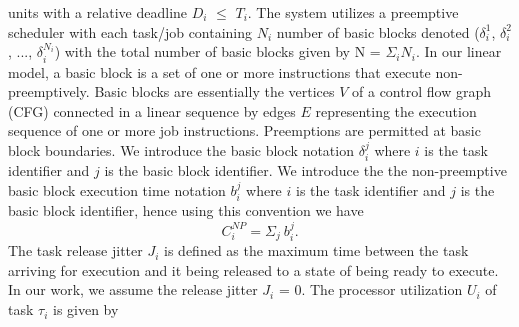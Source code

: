 units with a relative deadline \begin{math}D_{i}\end{math} \begin{math}\leq\end{math} \begin{math}T_{i}\end{math}.  The system utilizes a preemptive scheduler with each task/job containing \begin{math}N_{i}\end{math} number of basic blocks denoted (\begin{math}\delta_{i}^{1}\end{math}, \begin{math}\delta_{i}^{2}\end{math}, ..., \begin{math}\delta_{i}^{N_{i}}\end{math}) with the total number of basic blocks given by N = \begin{math}\Sigma_{i}\end{math}\begin{math}N_{i}\end{math}. In our linear model, a basic block is a set of one or more instructions that execute non-preemptively.  Basic blocks are essentially the vertices $V$ of a control flow graph (CFG) connected in a linear sequence by edges $E$ representing the execution sequence of one or more job instructions. Preemptions are permitted at basic block boundaries.  We introduce the basic block notation \begin{math}\delta_{i}^{j}\end{math} where $i$ is the task identifier and $j$ is the basic block identifier. We introduce the the non-preemptive basic block execution time notation \begin{math}b_{i}^{j}\end{math} where $i$ is the task identifier and $j$ is the basic block identifier, hence using this convention we have
\begin{equation}\label{eqn:c-np2}
    C_{i}^{NP} = \Sigma_{j}\ b_{i}^{j}.
\end{equation}
\noindent
The task release jitter \begin{math}J_{i}\end{math} is defined as the maximum time between the task arriving for execution and it being released to a state of being ready to execute.  In our work, we assume the release jitter \begin{math}J_{i}\end{math} = 0.  The processor utilization \begin{math}U_{i}\end{math} of task \begin{math}\tau_{i}\end{math} is given by
